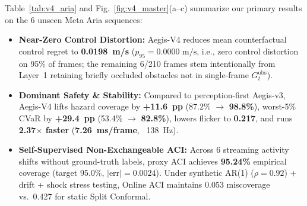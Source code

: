 \documentclass[journal]{IEEEtran}
\begin{document}
\begin{table}[t]
\centering
\caption{Flagship Benchmark on 6 Unseen Real Meta Aria Sequences ($k=5$, 210 Frames). Best values in \textbf{bold}.}
\label{tab:v4_aria}
\end{table}

Table~\ref{tab:v4_aria} and Fig.~\ref{fig:v4_master}(a--c) summarize our primary results on the 6 unseen Meta Aria sequences:
\begin{itemize}
    \item \textbf{Near-Zero Control Distortion:} Aegis-V4 reduces mean counterfactual control regret to \textbf{0.0198~m/s} ($p_{95} = 0.0000\text{ m/s}$, i.e., zero control distortion on 95\% of frames; the remaining 6/210 frames stem intentionally from Layer~1 retaining briefly occluded obstacles not in single-frame $G_t^{\text{obs}}$).
    \item \textbf{Dominant Safety \& Stability:} Compared to perception-first Aegis-v3, Aegis-V4 lifts hazard coverage by \textbf{+11.6~pp} (87.2\% $\to$ \textbf{98.8\%}), worst-5\% CVaR by \textbf{+29.4~pp} (53.4\% $\to$ \textbf{82.8\%}), lowers flicker to \textbf{0.217}, and runs \textbf{2.37$\times$ faster} (\textbf{7.26~ms/frame}, ~138~Hz).
    \item \textbf{Self-Supervised Non-Exchangeable ACI:} Across 6 streaming activity shifts without ground-truth labels, proxy ACI achieves \textbf{95.24\%} empirical coverage (target 95.0\%, $|\text{err}| = 0.0024$). Under synthetic AR(1) ($\rho = 0.92$) + drift + shock stress testing, Online ACI maintains 0.053 miscoverage vs.\ 0.427 for static Split Conformal.
\end{itemize}
\end{document}
